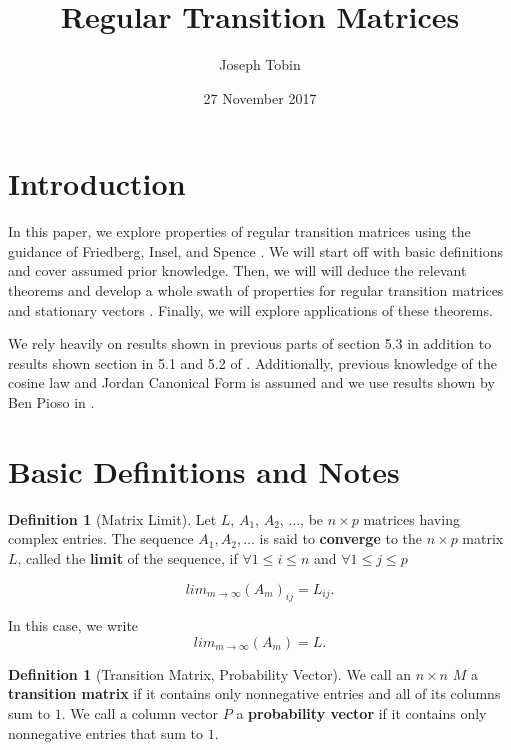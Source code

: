 \documentclass{amsart}
\title{Regular Transition Matrices}
\author{Joseph Tobin}
\date{27 November 2017}
\theoremstyle{definition}
\newtheorem{definition}[thm]{Definition}
\theoremstyle{remark}
\numberwithin{equation}{section}
\begin{document}
\maketitle





\section{Introduction}
In this paper, we explore properties of regular transition matrices using the guidance of Friedberg, Insel, and Spence \cite{friedberg2003linear}.
We will start off with basic definitions and cover assumed prior knowledge.
Then, we will will deduce the relevant theorems and develop a whole swath of properties for regular transition matrices and stationary vectors .
Finally, we will explore applications of these theorems.


We rely heavily on results shown in previous parts of section 5.3 in addition to results shown section in 5.1 and 5.2 of \cite{friedberg2003linear}.
Additionally, previous knowledge of the cosine law and Jordan Canonical Form is assumed and we use results shown by Ben Pioso in \cite{benspaper}.

\section{Basic Definitions and Notes}

\begin{definition}[Matrix Limit]
Let $L$, $A_1$, $A_2$, $\ldots$, be $n \times p$ matrices having complex entries.
The sequence $A_1, A_2, \ldots$ is said to \textbf{converge} to the $n \times p$ matrix $L$, called the \textbf{limit} of the sequence, if $\forall 1 \leq i \leq n$ and $\forall 1 \leq j \leq p$

$$lim_{m \to \infty}(A_m)_{ij} = L_{ij}.$$

In this case, we write $$ lim_{m \to \infty}(A_m) = L.$$


\end{definition}


\begin{definition}[Transition Matrix, Probability Vector]
We call an $n \times n$ $M$ a \textbf{transition matrix} if it contains only nonnegative entries and all of its columns sum to $1$.
We call a column vector $P$ a \textbf{probability vector} if it contains only nonnegative entries that sum to $1$.
\end{definition}
\end{document}
